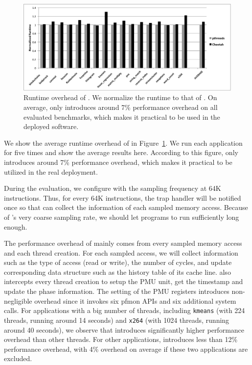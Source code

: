 \begin{figure}[htbp]
\centering
\label{fig:overhead}
\includegraphics[width=2\columnwidth]{figure/Overhead.pdf}
\caption{Runtime overhead of \Cheetah{}. We normalize the runtime to that of \pthreads{}. On average, \cheetah{} only introduces around 7\% performance overhead on all evaluated benchmarks, which makes it practical to be used in the deployed software. }
\end{figure}

We show the average runtime overhead of \cheetah{} in Figure~\ref{fig:overhead}. We run each application for five times and show the average results here. According to this figure, \cheetah{} only introduces around 7\% performance overhead, which makes it practical to be utilized in the real deployment. 

During the evaluation, we configure \cheetah{} with the sampling frequency at 64K instructions. Thus, for every 64K instructions, the trap handler will be notified once so that \cheetah{} can collect the information of each sampled memory access. Because of \cheetah{}'s very coarse sampling rate, we should let programs to run sufficiently long enough. 

The performance overhead of \cheetah{} mainly comes from every sampled memory access and each thread creation. For each sampled access, we will collect information such as the type of access (read or write), the number of cycles, and update corresponding data structure such as the history table of its cache line. \cheetah{} also intercepts every thread creation to setup the PMU unit, get the timestamp and update the phase information. The setting of the PMU registers introduces non-negligible overhead since it invokes six pfmon APIs and six additional system calls. For applications with a big number of threads, including \texttt{kmeans} (with 224 threads, running around 14 seconds) and \texttt{x264} (with 1024 threads, running around 40 seconds), we observe that \cheetah{} introduces significantly higher performance overhead than other threads. For other applications, \cheetah{} introduces less than 12\% performance overhead, with 4\% overhead on average if these two applications are excluded.  

